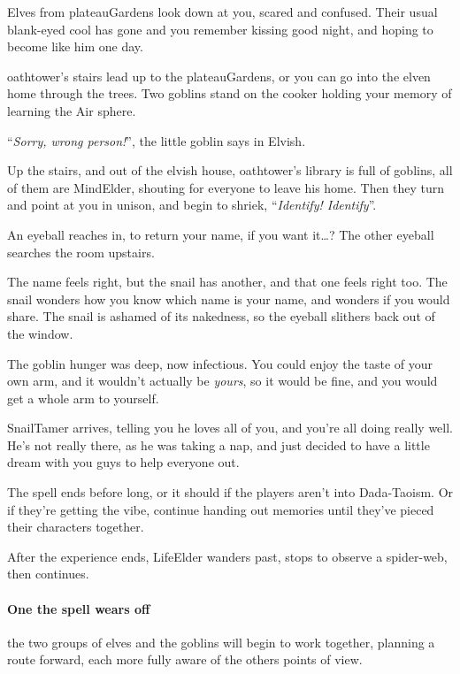 \begin{multicols}{2}
\begin{boxtext}
  Elves from \gls{plateauGardens} look down at you, scared and confused.
  Their usual blank-eyed cool has gone and you remember kissing  good night, and hoping to become like him one day.

  \Gls{oathtower}'s stairs lead up to the \gls{plateauGardens}, or you can go into the elven home through the trees.
  Two goblins stand on the cooker holding your memory of learning the Air \gls{sphere}.

    ``\textit{Sorry, wrong person!}'', the little goblin says in Elvish.

    Up the stairs, and out of the elvish house, \gls{oathtower}'s library is full of goblins, all of them are \gls{MindElder}, shouting for everyone to leave his home.
    Then they turn and point at you in unison, and begin to shriek, ``\textit{Identify! Identify}''.

    An eyeball reaches in, to return your name, if you want it\ldots ?
    The other eyeball searches the room upstairs.

    The name feels right, but the snail has another, and that one feels right too.
    The snail wonders how you know which name is your name, and wonders if you would share.
    The snail is ashamed of its nakedness, so the eyeball slithers back out of the window.

    The goblin hunger was deep, now infectious.
    You could enjoy the taste of your own arm, and it wouldn't actually be \emph{yours}, so it would be fine, and you would get a whole arm to yourself.

    \Gls{SnailTamer} arrives, telling you he loves all of you, and you're all doing really well.
    He's not really there, as he was taking a nap, and just decided to have a little dream with you guys to help everyone out.
\end{boxtext}

The spell ends before long, or it should if the players aren't into Dada-Taoism.
Or if they're getting the vibe, continue handing out memories until they've pieced their characters together.

After the experience ends, \gls{LifeElder} wanders past, stops to observe a spider-web, then continues.

\paragraph{One the spell wears off}
the two groups of elves and the goblins will begin to work together, planning a route forward, each more fully aware of the others points of view.


\end{multicols}
